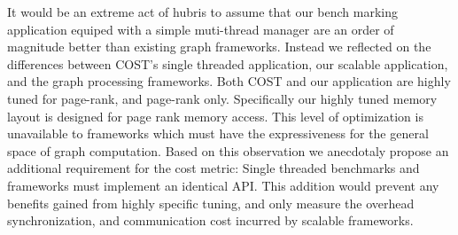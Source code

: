 It would be an extreme act of hubris to assume that our bench marking
application equiped with a simple muti-thread manager are an order of
magnitude better than existing graph frameworks. Instead we reflected on
the differences between COST's single threaded application, our
scalable application, and the graph processing frameworks. Both COST
and our application are highly tuned for page-rank, and page-rank
only. Specifically our highly tuned memory layout is designed for page
rank memory access. This level of optimization is unavailable to
frameworks which must have the expressiveness for the general space of
graph computation. Based on this observation we anecdotaly propose an
additional requirement for the cost metric: Single threaded benchmarks
and frameworks must implement an identical API. This addition would
prevent any benefits gained from highly specific tuning, and only
measure the overhead synchronization, and communication cost incurred
by scalable frameworks.


